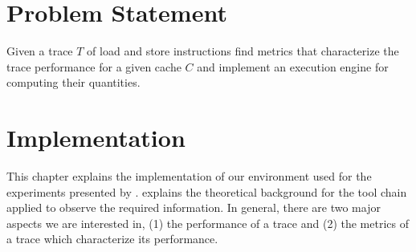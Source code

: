\documentclass[onecolumn, openright, master, english, signatures]{dbrgrptt}
\begin{document}


\chapter{Problem Statement}\label{cha:problems-tatement}
\begin{definition}
Given a \ac{trace} $T$ of load and store instructions find metrics that characterize the trace performance for a given cache $C$ and implement an execution engine for computing their quantities.
\end{definition}


\chapter{Implementation}\label{cha:implementation}

This chapter explains the implementation of our environment used for the experiments presented by .
 explains the theoretical background for the tool chain applied to observe the required information.
In general, there are two major aspects we are interested in, (1) the performance of a \ac{trace} and (2) the metrics of a \ac{trace} which characterize its performance.

\end{document}
